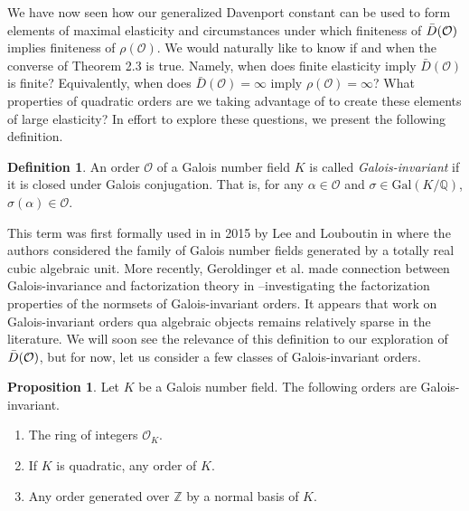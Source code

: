 \documentclass{amsart}
\theoremstyle{definition}
\newtheorem{prop}[lem]{Proposition}
\newtheorem{defn}[lem]{Definition}
\newcommand{\MO}{\mathcal{O}}
\newcommand{\bbz}{\mathbb{Z}}
\newcommand{\bbq}{\mathbb{Q}}
\numberwithin{equation}{section}
\begin{document}
We have now seen how our generalized Davenport constant can be used to form elements of maximal elasticity and circumstances under which finiteness of $\Bar{D}(\MO)$ implies finiteness of $\rho(\MO)$. We would naturally like to know if and when the converse of Theorem 2.3 is true. Namely, when does finite elasticity imply $\bar{D}(\MO)$ is finite? Equivalently, when does $\bar{D}(\MO) = \infty$ imply $\rho(\MO) = \infty$? What properties of quadratic orders are we taking advantage of to create these elements of large elasticity? In effort to explore these questions, we present the following definition.

\begin{defn}
    An order $\MO$ of a Galois number field $K$ is called \textit{Galois-invariant} if it is closed under Galois conjugation. That is, for any $\alpha \in \MO$ and $\sigma \in \text{Gal}(K/\bbq)$, $\sigma (\alpha) \in \MO$. 
\end{defn}

This term was first formally used in in 2015 by Lee and Louboutin in \cite{lee2015determination} where the authors considered the family of Galois number fields generated by a totally real cubic algebraic unit. More recently, Geroldinger et al. made connection between Galois-invariance and factorization theory in \cite{geroldinger2022monoids}--investigating the factorization properties of the normsets of Galois-invariant orders. It appears that work on Galois-invariant orders qua algebraic objects remains relatively sparse in the literature. We will soon see the relevance of this definition to our exploration of $\Bar{D}(\MO)$, but for now, let us consider a few classes of Galois-invariant orders.

\begin{prop}
    Let $K$ be a Galois number field. The following orders are Galois-invariant.

    \begin{enumerate}
        \item The ring of integers $\MO_K$.

        \item If $K$ is quadratic, any order of $K$.

        \item Any order generated over $\bbz$ by a normal basis of $K$.
    \end{enumerate}
\end{prop}
\end{document}
